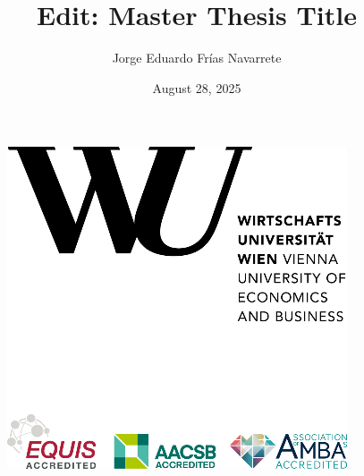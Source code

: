\documentclass[
  12pt,
  a4paper,
  openany]{scrbook}
\title{Edit: Master Thesis Title}
\author{Jorge Eduardo Frías Navarrete}
\date{August 28, 2025}
\begin{document}
\frontmatter


\thispagestyle{empty}
\begin{figure}[h!]
    \raggedleft
    \includegraphics[scale=0.9]{pictures/WULogo.png}
\end{figure}

\vspace{1em}
\end{document}
